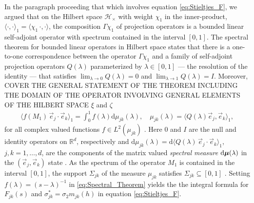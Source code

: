 \documentclass{cmslatex}
\renewcommand{\d}{\text{d}}
\newcommand\bmu{\mbox{\boldmath${\mu}$}}
\begin{document}
In the paragraph proceeding that which involves equation
\eqref{eq:Stieltjes_F}, we argued that on the Hilbert space
$\mathscr{H}_\times$ with weight $\chi_1$ in the inner-product,
$\langle\cdot,\cdot\rangle_1=\langle\chi_1\,\cdot,\cdot\rangle$, the composition $\Gamma\chi_1$ of projection operators
is a bounded linear self-adjoint operator with spectrum contained in
the interval $[0,1]$. The spectral theorem for bounded linear
operators in Hilbert space \cite{Stone:64} states that there is a
one-to-one correspondence between the operator $\Gamma\chi_1$ and a family of
self-adjoint projection operators $Q(\lambda)$ parameterized by $\lambda\in[0,1]$
--- the resolution of the identity --- that satisfies
$\lim_{\lambda\to0}Q(\lambda)=0$ and $\lim_{\lambda\to1}Q(\lambda)=I$. Moreover,
COVER THE GENERAL STATEMENT OF THE THEOREM INCLUDING THE DOMAIN OF THE OPERATOR
INVOLVING GENERAL ELEMENTS OF THE HILBERT SPACE $\xi$ and $\zeta$
% 
\begin{align}\label{eq:Spectral_Theorem}  
  \langle f(M_1)\,\vec{e}_j\cdot\vec{e}_k\rangle_1= \int_0^1f(\lambda)\d\mu_{jk}(\lambda), \quad
  \mu_{jk}(\lambda)=\langle Q(\lambda)\vec{e}_j,\vec{e}_k\rangle_1,
\end{align}
%
for all complex valued functions $f\in L^2(\mu_{jk})$ \cite{Stone:64}. Here
$0$ and $I$ are the null and identity operators on $\mathbb{R}^d$,
respectively and $\d\mu_{jk}(\lambda)=\d\langle Q(\lambda)\,\vec{e}_j\cdot\vec{e}_k\rangle_1$,
$j,k=1,\ldots,d$, are the components of the matrix valued \emph{spectral
  measure} $\d\bmu(\lambda)$ in the $(\vec{e}_j,\vec{e}_k)$ state
\cite{Golden:CMP-473,Reed-1980,Stone:64}. As the spectrum of the 
operator $M_1$ is contained in the interval $[0,1]$, the support
$\Sigma_{jk}$ of the measure $\mu_{jk}$ satisfies $\Sigma_{jk}\subseteq[0,1]$
\cite{Reed-1980}. Setting $f(\lambda)=(s-\lambda)^{-1}$ in
\eqref{eq:Spectral_Theorem} yields the the integral formula for 
$F_{jk}(s)$ and $\sigma_{jk}^*=\sigma_2m_{jk}(h)$ in equation \eqref{eq:Stieltjes_F}.
\end{document}
